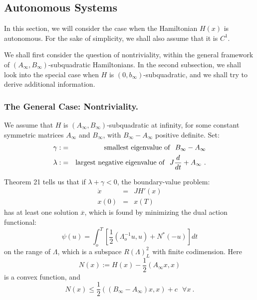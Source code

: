 \documentclass{llncs}
\begin{document}
%
\subsection{Autonomous Systems}
%
In this section, we will consider the case when the Hamiltonian $H(x)$
is autonomous. For the sake of simplicity, we shall also assume that it
is $C^{1}$.

We shall first consider the question of nontriviality, within the
general framework of
$\left(A_{\infty},B_{\infty}\right)$-subquadratic Hamiltonians. In
the second subsection, we shall look into the special case when $H$ is
$\left(0,b_{\infty}\right)$-subquadratic,
and we shall try to derive additional information.
%
\subsubsection{The General Case: Nontriviality.}
%
We assume that $H$ is
$\left(A_{\infty},B_{\infty}\right)$-sub\-qua\-dra\-tic at infinity,
for some constant symmetric matrices $A_{\infty}$ and $B_{\infty}$,
with $B_{\infty}-A_{\infty}$ positive definite. Set:
\begin{eqnarray}
\gamma :&=&{\rm smallest\ eigenvalue\ of}\ \ B_{\infty} - A_{\infty} \\
  \lambda : &=& {\rm largest\ negative\ eigenvalue\ of}\ \
  J \frac{d}{dt} +A_{\infty}\ .
\end{eqnarray}

Theorem 21 tells us that if $\lambda +\gamma < 0$, the boundary-value
problem:
\begin{equation}
\begin{array}{rcl}
  \dot{x}&=&JH' (x)\\
  x(0)&=&x (T)
\end{array}
\end{equation}
has at least one solution
$\overline{x}$, which is found by minimizing the dual
action functional:
\begin{equation}
  \psi (u) = \int_{o}^{T} \left[\frac{1}{2}
  \left(\Lambda_{o}^{-1} u,u\right) + N^{\ast} (-u)\right] dt
\end{equation}
on the range of $\Lambda$, which is a subspace $R (\Lambda)_{L}^{2}$
with finite codimension. Here
\begin{equation}
  N(x) := H(x) - \frac{1}{2} \left(A_{\infty} x,x\right)
\end{equation}
is a convex function, and
\begin{equation}
  N(x) \le \frac{1}{2}
  \left(\left(B_{\infty} - A_{\infty}\right) x,x\right)
  + c\ \ \ \forall x\ .
\end{equation}
\end{document}
